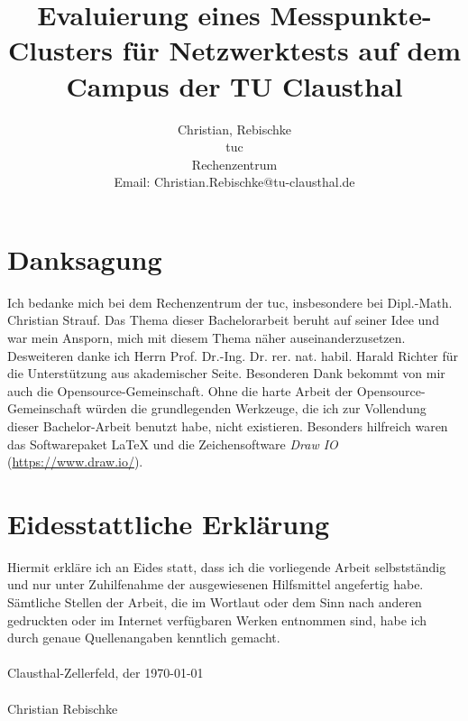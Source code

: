 \documentclass[titlepage]{report}
\title{Evaluierung eines Messpunkte-Clusters für Netzwerktests auf dem
Campus der TU Clausthal}
\author{Christian, Rebischke\\
\gls{tuc}\\
Rechenzentrum\\
Email: Christian.Rebischke@tu-clausthal.de}
\begin{document}
\maketitle
\chapter*{Danksagung}
Ich bedanke mich bei dem Rechenzentrum der \gls{tuc}, insbesondere bei
Dipl.\hyp{}Math. Christian Strauf. Das Thema dieser Bachelorarbeit
beruht auf seiner Idee und war mein Ansporn, mich mit diesem Thema näher
auseinanderzusetzen. Desweiteren danke ich Herrn Prof. Dr.\hyp{}Ing. Dr.
rer. nat. habil. Harald Richter für die Unterstützung aus akademischer
Seite. Besonderen Dank bekommt von mir auch die
Opensource\hyp{}Gemeinschaft.  Ohne die harte Arbeit der
Opensource\hyp{}Gemeinschaft würden die grundlegenden Werkzeuge, die
ich zur Vollendung dieser Bachelor-Arbeit benutzt habe, nicht
existieren. Besonders hilfreich waren das Softwarepaket \LaTeX{} und die
Zeichensoftware \emph{Draw IO} (\url{https://www.draw.io/}).
\chapter*{Eidesstattliche Erklärung}
Hiermit erkläre ich an Eides statt, dass ich die vorliegende Arbeit
selbstständig und nur unter Zuhilfenahme der ausgewiesenen Hilfsmittel
angefertig habe. Sämtliche Stellen der Arbeit, die im Wortlaut oder dem
Sinn nach anderen gedruckten oder im Internet verfügbaren Werken
entnommen sind, habe ich durch genaue Quellenangaben kenntlich gemacht.
\\
\\
Clausthal-Zellerfeld, der \today
\\
\\
Christian Rebischke
\tableofcontents
\end{document}
